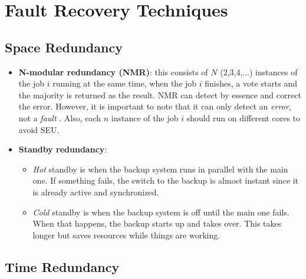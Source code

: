 \documentclass[11pt,a4paper]{report}
\begin{document}
\section{Fault Recovery Techniques}
\subsection{Space Redundancy}
\begin{itemize}
    \item \textbf{N-modular redundancy (NMR)}: this consists of $N$ (2,3,4,...) instances of the job $i$ running at the same time, when the job $i$ finishes, a vote starts and the majority is returned as the result. 
    NMR can detect by essence and correct the error. 
    However, it is important to note that it can only detect an \textit{error}, not a \textit{fault} \cite{future-research}. 
    Also, each $n$ instance of the job $i$ should run on different cores to avoid SEU. 
    
    \item \textbf{Standby redundancy}:
    \begin{itemize}
        \item \textit{Hot} standby is when the backup system runs in parallel with the main one. 
        If something fails, the switch to the backup is almost instant since it is already active and synchronized.
        \item \textit{Cold} standby is when the backup system is off until the main one fails. 
        When that happens, the backup starts up and takes over. 
        This takes longer but saves resources while things are working.
    \end{itemize}
\end{itemize}
\subsection{Time Redundancy}
\end{document}
